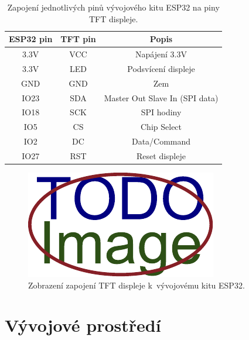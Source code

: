\begin{table}[h!]
    \centering
    \begin{tabular}{|c|c|c|}
        \hline
        \textbf{ESP32 pin}  & \textbf{TFT pin} & \textbf{Popis} \\
        \hline
        3.3V                & VCC              & Napájení 3.3V \\
        \hline
        3.3V                & LED              & Podsvícení displeje \\
        \hline
        GND                 & GND              & Zem \\
        \hline
        IO23                & SDA              & Master Out Slave In (SPI data) \\
        \hline
        IO18                & SCK              & SPI hodiny \\
        \hline
        IO5                 & CS               & Chip Select  \\
        \hline
        IO2                 & DC               & Data/Command \\
        \hline
        IO27                & RST              & Reset displeje \\
        \hline
    \end{tabular}
    \caption{Zapojení jednotlivých pinů vývojového kitu ESP32 na piny TFT displeje.}
    \label{tab:esp32_tft_piny}
\end{table}

\begin{figure}[h!]
    \centering
    \includegraphics[width=0.7\linewidth]{obrazky-figures/placeholder.pdf}
    \caption{Zobrazení zapojení TFT displeje k~vývojovému kitu ESP32.}
    \label{fig:zapojeni}
\end{figure}

\section{Vývojové prostředí}


